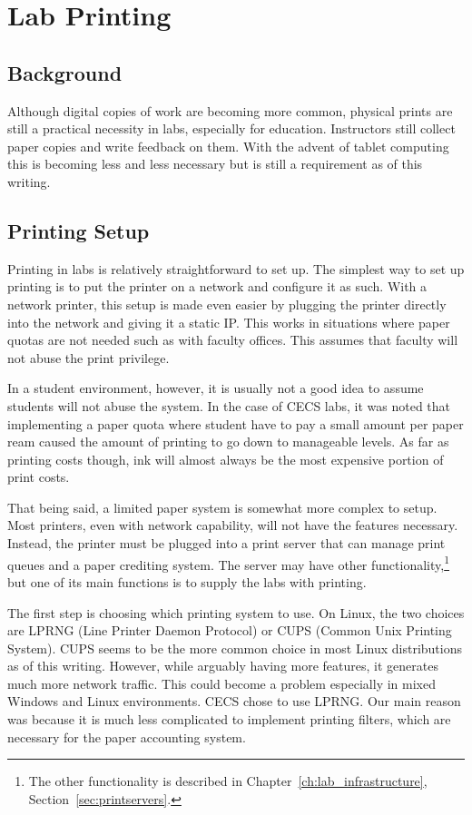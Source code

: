 \section{Lab Printing} \label{sec:lab_printing}
\subsection{Background}
Although digital copies of work are becoming more common, physical prints are still a practical necessity in labs, especially for education.  Instructors still collect paper copies and write feedback on them.  With the advent of tablet computing this is becoming less and less necessary but is still a requirement as of this writing.  

\subsection{Printing Setup}
Printing in labs is relatively straightforward to set up.  The simplest way to set up printing is to put the printer on a network and configure it as such.  With a network printer, this setup is made even easier by plugging the printer directly into the network and giving it a static IP.  This works in situations where paper quotas are not needed such as with faculty offices.  This assumes that faculty will not abuse the print privilege.  

In a student environment, however, it is usually not a good idea to assume students will not abuse the system.  In the case of CECS labs, it was noted that implementing a paper quota where student have to pay a small amount per paper ream caused the amount of printing to go down to manageable levels.  As far as printing costs though, ink will almost always be the most expensive portion of print costs.  

That being said, a limited paper system is somewhat more complex to setup.  Most printers, even with network capability, will not have the features necessary.  Instead, the printer must be plugged into a print server that can manage print queues and a paper crediting system.  The server may have other functionality,\footnote{The other functionality is described in Chapter~\ref{ch:lab_infrastructure}, Section~\ref{sec:printservers}.} but one of its main functions is to supply the labs with printing.  

The first step is choosing which printing system to use.  On Linux, the two choices are LPRNG (Line Printer Daemon Protocol) or CUPS (Common Unix Printing System).  CUPS seems to be the more common choice in most Linux distributions as of this writing.  However, while arguably having more features, it generates much more network traffic.  This could become a problem especially in mixed Windows and Linux environments.  CECS chose to use LPRNG.  Our main reason was because it is much less complicated to implement printing filters, which are necessary for the paper accounting system.

